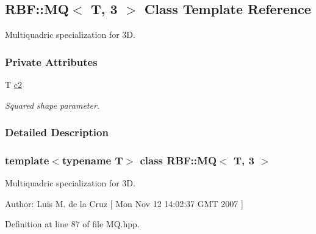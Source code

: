 \hypertarget{classRBF_1_1MQ_3_01T_00_013_01_4}{
\subsection{RBF::MQ$<$ T, 3 $>$ Class Template Reference}
\label{classRBF_1_1MQ_3_01T_00_013_01_4}
}
Multiquadric specialization for 3D.  


\subsubsection*{Private Attributes}
\begin{CompactItemize}
\item 
\hypertarget{classRBF_1_1MQ_3_01T_00_013_01_4_ebdf4ff61f057a7b62ffd1ba2da7c625}{
T \hyperlink{classRBF_1_1MQ_3_01T_00_013_01_4_ebdf4ff61f057a7b62ffd1ba2da7c625}{c2}}
\label{classRBF_1_1MQ_3_01T_00_013_01_4_ebdf4ff61f057a7b62ffd1ba2da7c625}

\begin{CompactList}\small\item\em Squared shape parameter. \item\end{CompactList}\end{CompactItemize}


\subsubsection{Detailed Description}
\subsubsection*{template$<$typename T$>$ class RBF::MQ$<$ T, 3 $>$}

Multiquadric specialization for 3D. 

\begin{Desc}
\item[Author:]Luis M. de la Cruz \mbox{[} Mon Nov 12 14:02:37 GMT 2007 \mbox{]} \end{Desc}


Definition at line 87 of file MQ.hpp.